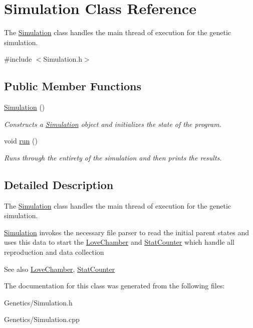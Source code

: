 \hypertarget{class_simulation}{}\section{Simulation Class Reference}
\label{class_simulation}


The \hyperlink{class_simulation}{Simulation} class handles the main thread of execution for the genetic simulation.  




{\ttfamily \#include $<$Simulation.\+h$>$}

\subsection*{Public Member Functions}
\begin{DoxyCompactItemize}
\item 
\hypertarget{class_simulation_a5b224cc5b36bcc8eb29689aff223de41}{}\hyperlink{class_simulation_a5b224cc5b36bcc8eb29689aff223de41}{Simulation} ()\label{class_simulation_a5b224cc5b36bcc8eb29689aff223de41}

\begin{DoxyCompactList}\small\item\em Constructs a \hyperlink{class_simulation}{Simulation} object and initializes the state of the program. \end{DoxyCompactList}\item 
\hypertarget{class_simulation_ae5c367f87c0b5dc9740bc6d00e44e72c}{}void \hyperlink{class_simulation_ae5c367f87c0b5dc9740bc6d00e44e72c}{run} ()\label{class_simulation_ae5c367f87c0b5dc9740bc6d00e44e72c}

\begin{DoxyCompactList}\small\item\em Runs through the entirety of the simulation and then prints the results. \end{DoxyCompactList}\end{DoxyCompactItemize}


\subsection{Detailed Description}
The \hyperlink{class_simulation}{Simulation} class handles the main thread of execution for the genetic simulation. 

\hyperlink{class_simulation}{Simulation} invokes the necessary file parser to read the initial parent states and uses this data to start the \hyperlink{class_love_chamber}{Love\+Chamber} and \hyperlink{class_stat_counter}{Stat\+Counter} which handle all reproduction and data collection \begin{DoxySeeAlso}{See also}
\hyperlink{class_love_chamber}{Love\+Chamber}, \hyperlink{class_stat_counter}{Stat\+Counter} 
\end{DoxySeeAlso}


The documentation for this class was generated from the following files\+:\begin{DoxyCompactItemize}
\item 
Genetics/Simulation.\+h\item 
Genetics/Simulation.\+cpp\end{DoxyCompactItemize}
